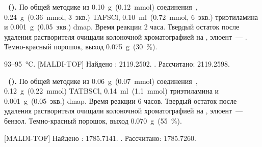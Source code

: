\textbf{~().} 
По общей методике из \SI{0.10}{\gram}~(\SI{0.12}{\milli\mole}) соединения~, \SI{0.24}{\gram}~(\SI{0.36}{\milli\mole}, 3~экв.) TAFSCl, \SI{0.10}{\milli\litre}~(\SI{0.72}{\milli\mole}, 6~экв.) триэтиламина и \SI{0.001}{\gram}~(0.05~экв.) \ac{dmap}.
Время реакции 2 часа. Твердый остаток после удаления растворителя очищали колоночной хроматографией на , элюент~--- .
Темно-красный порошок, выход \SI{0.075}{\gram}~(\SI{30}{\percent}).
\begin{experimental}
     93--\SI{95}{\celsius}.
    [MALDI-TOF] Найдено \ce{[M - H]-}: \num{2119.2502}. . Рассчитано: \ce{[M - H]} \num{2119.2598}.
\end{experimental}

\textbf{~().}
По общей методике из \SI{0.06}{\gram}~(\SI{0.07}{\milli\mole}) соединения~, \SI{0.12}{\gram}~(\SI{0.22}{\milli\mole}) TATBSCl, \SI{0.14}{\milli\litre}~(\SI{1.1}{\milli\mole}) триэтиламина и \SI{0.001}{\gram}~(0.05~экв.) \ac{dmap}.
Время реакции 6 часов. Твердый остаток после удаления растворителя очищали колоночной хроматографией на , элюент~--- бензол.
Темно-красный порошок, выход \SI{0.070}{\gram}~(\SI{55}{\percent}).
\begin{experimental}
    [MALDI-TOF] Найдено \ce{[M + H]+}: \num{1785.7141}. . Рассчитано: \ce{[M + H]} \num{1785.7260}.
\end{experimental}

